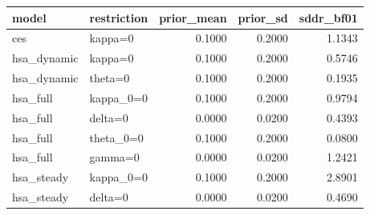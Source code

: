 \begin{tabular}{llrrr}
\toprule
model & restriction & prior\_mean & prior\_sd & sddr\_bf01 \\
\midrule
ces & kappa=0 & 0.1000 & 0.2000 & 1.1343 \\
hsa\_dynamic & kappa=0 & 0.1000 & 0.2000 & 0.5746 \\
hsa\_dynamic & theta=0 & 0.1000 & 0.2000 & 0.1935 \\
hsa\_full & kappa\_0=0 & 0.1000 & 0.2000 & 0.9794 \\
hsa\_full & delta=0 & 0.0000 & 0.0200 & 0.4393 \\
hsa\_full & theta\_0=0 & 0.1000 & 0.2000 & 0.0800 \\
hsa\_full & gamma=0 & 0.0000 & 0.0200 & 1.2421 \\
hsa\_steady & kappa\_0=0 & 0.1000 & 0.2000 & 2.8901 \\
hsa\_steady & delta=0 & 0.0000 & 0.0200 & 0.4690 \\
\bottomrule
\end{tabular}
